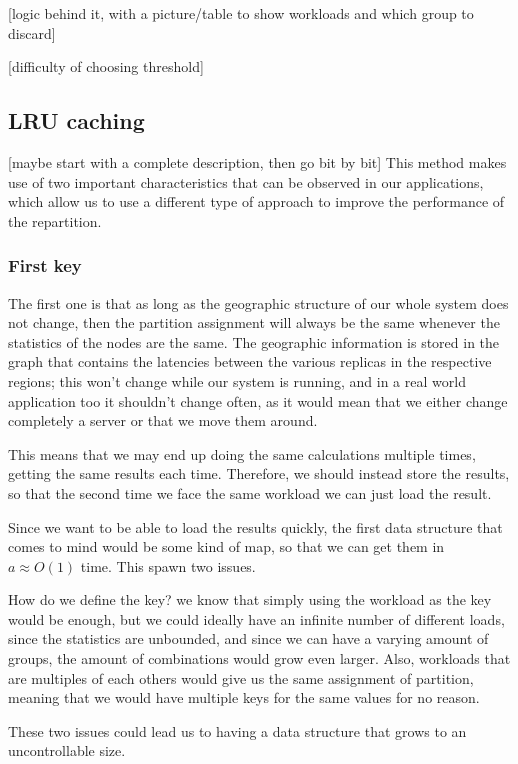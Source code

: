 [logic behind it, with a picture/table to show workloads and which group to discard]

[difficulty of choosing threshold]

\subsection{LRU caching}\label{sec:lru-caching}
[maybe start with a complete description, then go bit by bit]
This method makes use of two important characteristics that can be observed in our applications, which allow us to use a different type of approach to improve the performance of the repartition.

\subsubsection{First key}\label{sec:first-key}
The first one is that as long as the geographic structure of our whole system does not change, then the partition assignment will always be the same whenever the statistics of the nodes are the same. The geographic information is stored in the graph that contains the latencies between the various replicas in the respective regions; this won't change while our system is running, and in a real world application too it shouldn't change often, as it would mean that we either change completely a server or that we move them around. 

This means that we may end up doing the same calculations multiple times, getting the same results each time. Therefore, we should instead store the results, so that the second time we face the same workload we can just load the result. 

Since we want to be able to load the results quickly, the first data structure that comes to mind would be some kind of map, so that we can get them in $a\approx O(1)$ time. This spawn two issues.

How do we define the key? we know that simply using the workload as the key would be enough, but we could ideally have an infinite number of different loads, since the statistics are unbounded, and since we can have a varying amount of groups, the amount of combinations would grow even larger. Also, workloads that are multiples of each others would give us the same assignment of partition, meaning that we would have multiple keys for the same values for no reason.

These two issues could lead us to having a data structure that grows to an uncontrollable size.


